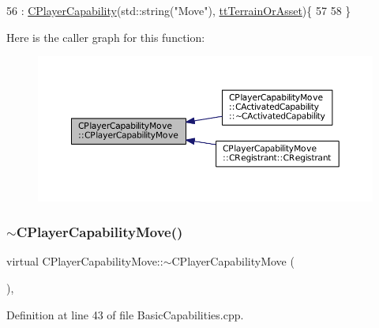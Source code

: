 \begin{DoxyCode}
56                                              : \hyperlink{classCPlayerCapability_a303de62aba5d3f65d9a8e013c64a96c1}{CPlayerCapability}(std::string(\textcolor{stringliteral}{"Move"}), 
      \hyperlink{classCPlayerCapability_a9d3450ed1532fd536bd6cbb1e2eef02fa67cc6d11bc0aafc1b786bd6557ba4aa2}{ttTerrainOrAsset})\{
57 
58 \}
\end{DoxyCode}
Here is the caller graph for this function\+:\nopagebreak
\begin{figure}[H]
\begin{center}
\leavevmode
\includegraphics[width=350pt]{classCPlayerCapabilityMove_a6bfe72663b6b5fc708d23373dc293ec7_icgraph}
\end{center}
\end{figure}
\hypertarget{classCPlayerCapabilityMove_ab355e3a0f8c82ee10b5ccf95c9e32d89}{}\label{classCPlayerCapabilityMove_ab355e3a0f8c82ee10b5ccf95c9e32d89} 
\subsubsection{\texorpdfstring{$\sim$\+C\+Player\+Capability\+Move()}{~CPlayerCapabilityMove()}}
{\footnotesize\ttfamily virtual C\+Player\+Capability\+Move\+::$\sim$\+C\+Player\+Capability\+Move (\begin{DoxyParamCaption}{ }\end{DoxyParamCaption})\hspace{0.3cm}{\ttfamily [inline]}, {\ttfamily [virtual]}}



Definition at line 43 of file Basic\+Capabilities.\+cpp.


